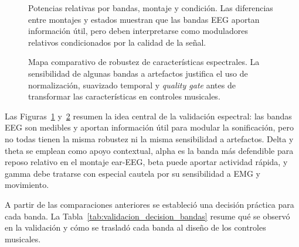 \documentclass[../main.tex]{subfiles}
\begin{document}
\begin{figure}[htbp]
    \centering
    \caption{Potencias relativas por bandas, montaje y condición. Las diferencias entre montajes y estados muestran que las bandas EEG aportan información útil, pero deben interpretarse como moduladores relativos condicionados por la calidad de la señal.}
    \label{fig:validacion_bandas_por_montaje}
\end{figure}

\begin{figure}[htbp]
    \centering
    \caption{Mapa comparativo de robustez de características espectrales. La sensibilidad de algunas bandas a artefactos justifica el uso de normalización, suavizado temporal y \textit{quality gate} antes de transformar las características en controles musicales.}
    \label{fig:validacion_robustez_features}
\end{figure}

Las Figuras~\ref{fig:validacion_bandas_por_montaje} y~\ref{fig:validacion_robustez_features} resumen la idea central de la validación espectral: las bandas EEG son medibles y aportan información útil para modular la sonificación, pero no todas tienen la misma robustez ni la misma sensibilidad a artefactos. Delta y theta se emplean como apoyo contextual, alpha es la banda más defendible para reposo relativo en el montaje ear-EEG, beta puede aportar actividad rápida, y gamma debe tratarse con especial cautela por su sensibilidad a EMG y movimiento.

A partir de las comparaciones anteriores se estableció una decisión práctica para cada banda. La Tabla~\ref{tab:validacion_decision_bandas} resume qué se observó en la validación y cómo se trasladó cada banda al diseño de los controles musicales.
\end{document}
